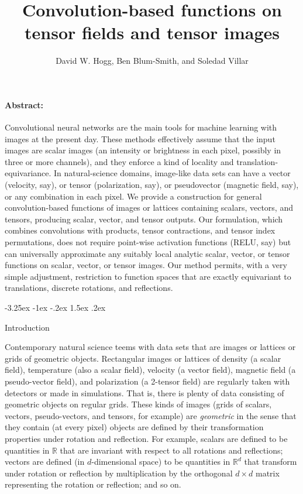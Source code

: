 \documentclass{article}
\title{\bfseries%
Convolution-based functions
on tensor fields and tensor images}
\author{David W. Hogg, Ben Blum-Smith, and Soledad Villar}
\date{}
\makeatletter
\theoremstyle{plain}
\renewcommand\section{\@startsection {section}{1}{\z@}%
  {-3.25ex \@plus -1ex \@minus -.2ex}%
  {1.5ex \@plus .2ex}%
  {\raggedright\normalfont\large\bfseries}}
\makeatother
\begin{document}
\maketitle\thispagestyle{empty}

\paragraph{Abstract:}
Convolutional neural networks are the main tools for machine learning with images at the present day.
These methods effectively assume that the input images are scalar images (an intensity or brightness in each pixel, possibly in three or more channels), and they enforce a kind of locality and translation-equivariance.
In natural-science domains, image-like data sets can have a vector (velocity, say), or tensor (polarization, say), or pseudovector (magnetic field, say), or any combination in each pixel.
We provide a construction for general convolution-based functions of images or lattices
containing scalars, vectors, and tensors, producing scalar, vector, and tensor outputs.
Our formulation, which combines convolutions with products, tensor contractions, and tensor index permutations, does not require point-wise activation functions (RELU, say) but can universally approximate any suitably local analytic scalar, vector, or tensor functions on scalar, vector, or tensor images.
Our method permits, with a very simple adjustment, restriction to function spaces that are exactly equivariant to translations, discrete rotations, and reflections.

\section{Introduction}

Contemporary natural science teems with data sets that are images or lattices or grids of geometric objects.
Rectangular images or lattices of density (a scalar field), temperature (also a scalar field), velocity (a vector field), magnetic field (a pseudo-vector field), and polarization (a 2-tensor field) are regularly taken with detectors or made in simulations.
That is, there is plenty of data consisting of geometric objects on regular grids.
These kinds of images (grids of scalars, vectors, pseudo-vectors, and tensors, for example) are \emph{geometric} in the sense that they contain (at every pixel) objects are defined by their transformation properties under rotation and reflection.
For example, scalars are defined to be quantities in $\mathbb R$ that are invariant with respect to all rotations and reflections; vectors are defined (in $d$-dimensional space) to be quantities in $\mathbb R^d$ that transform under rotation or reflection by multiplication by the orthogonal $d\times d$ matrix representing the rotation or reflection; and so on.
\end{document}
